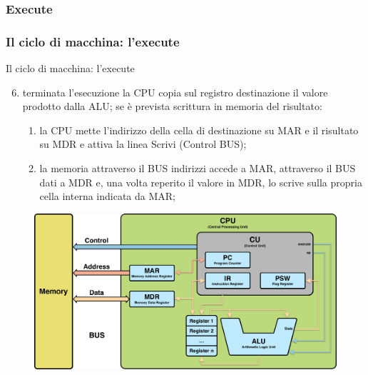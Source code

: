 \subsubsection[Execute]{Execute}
\begin{frame}
	\frametitle{Il ciclo di macchina: l'{\color{CpuYellow}\textbf{execute}}}
	
	\begin{block}{Il ciclo di macchina: l'execute}	
		\begin{enumerate}
			\setcounter{enumi}{5}
			\item terminata l'esecuzione la CPU copia sul registro destinazione il valore prodotto dalla ALU; se è prevista scrittura in memoria del risultato:
				
				\begin{enumerate}
					\item la CPU mette l'indirizzo della cella di destinazione su MAR e il risultato su MDR e attiva la linea Scrivi (Control BUS);
					\item la memoria attraverso il BUS indirizzi accede a MAR, attraverso il BUS dati a MDR e, una volta reperito il valore in MDR, lo scrive sulla propria cella interna indicata da MAR;
				\end{enumerate}
		\end{enumerate}
	
	\end{block}
	
	\begin{figure}[!htbp] 
		\centering
		\includegraphics[width=0.51\linewidth]{images/4_cpu/architecture_cpu_complex.pdf}
		\label{fig:cpu_complex}
	\end{figure}
	
\end{frame}


